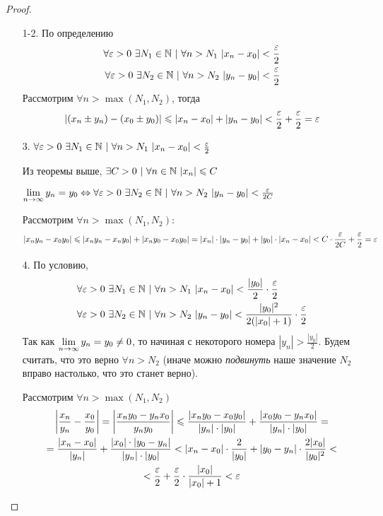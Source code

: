\begin{proof}
\begin{enumerate}
    \item[1-2.] 
    По определению
    \begin{align*}
        \forall \eps > 0\ \exists N_1 \in \N\ |\ \forall n > N_1\ |x_n - x_0| < \frac{\eps}{2}
        \\
        \forall \eps > 0\ \exists N_2 \in \N\ |\ \forall n > N_2\ |y_n - y_0| < \frac{\eps}{2}
    \end{align*}
    Рассмотрим $\forall n > \max(N_1, N_2)$, тогда
    $$
        |(x_n \pm y_n) - (x_0 \pm y_0)| \leqslant |x_n - x_0| + |y_n - y_0| < \frac{\varepsilon}{2} + \frac{\varepsilon}{2} = \varepsilon
    $$
    \item[3.] 
    $\forall \varepsilon > 0\ \exists N_1 \in \mathbb{N}\ |\ \forall n > N_1\ |x_n - x_0| < \frac{\varepsilon}{2}$
    
    Из теоремы выше, $\exists C > 0\ |\ \forall n \in \N\ |x_n| \le C$
    
    $\lim\limits_{n \to \infty} y_n = y_0 \Leftrightarrow \forall \varepsilon > 0\ \exists N_2 \in \mathbb{N}\ |\ \forall n > N_2\ |y_n - y_0| < \frac{\varepsilon}{2C}$
    
    Рассмотрим $\forall n > \max(N_1, N_2)$:
    $$
        |x_n y_n - x_0 y_0| \leqslant |x_n y_n - x_n y_0| + |x_n y_0 - x_0 y_0| = |x_n| \cdot |y_n - y_0| + |y_0| \cdot |x_n - x_0| < C \cdot \frac{\varepsilon}{2C} + \frac{\varepsilon}{2} = \varepsilon
    $$
    \item[4.]
    По условию,
    \begin{align*}
    	&\forall \varepsilon > 0\ \exists N_1 \in \mathbb{N}\ |\ \forall n > N_1\ |x_n - x_0| < \frac{|y_0|}{2} \cdot \frac{\varepsilon}{2}
    	\\
    	&\forall \varepsilon > 0\ \exists N_2 \in \mathbb{N}\ |\ \forall n > N_2\ |y_n - y_0| < \frac{|y_0|^2}{2(|x_0| + 1)} \cdot \frac{\varepsilon}{2}
    \end{align*}
    Так как $\lim\limits_{n \to \infty} y_n = y_0 \neq 0$, то начиная с некоторого номера $|y_n| > \frac{|y_0|}{2}$. Будем считать, что это верно $\forall n > N_2$ (иначе можно \textit{подвинуть} наше значение $N_2$ вправо настолько, что это станет верно).
   	
    Рассмотрим $\forall n > \max(N_1, N_2)$
    \begin{multline*}
        \left|\frac{x_n}{y_n} - \frac{x_0}{y_0}\right| = \left|\frac{x_n y_0 - y_n x_0}{y_n y_0}\right| \leqslant \frac{|x_n y_0 - x_0 y_0|}{|y_n| \cdot |y_0|} + \frac{|x_0 y_0 - y_n x_0|}{|y_n| \cdot |y_0|} =
        \\
        = \frac{|x_n - x_0|}{|y_n|} + \frac{|x_0| \cdot |y_0 - y_n|}{|y_n| \cdot |y_0|} < |x_n - x_0|\cdot \frac{2}{|y_0|} + |y_0 - y_n| \cdot \frac{2|x_0|}{|y_0|^2} <
        \\
        < \frac{\varepsilon}{2} + \frac{\varepsilon}{2} \cdot \frac{|x_0|}{|x_0| + 1} < \varepsilon
    \end{multline*}
\end{enumerate}
\end{proof}